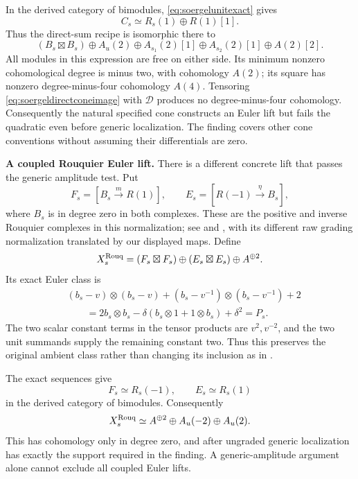 In the derived category of bimodules,
\eqref{eq:soergelunitexact} gives
\[
                     C_s\simeq R_s(1)\oplus R(1)[1].
\]
Thus the direct-sum recipe is isomorphic there to
\begin{equation}\label{eq:soergeldirectconeimage}
 (B_s\boxtimes B_s)\oplus A_u(2)
 \oplus A_{s_1}(2)[1]\oplus A_{s_2}(2)[1]
 \oplus A(2)[2].
\end{equation}
All modules in this expression are free on either side.
Its minimum nonzero cohomological degree is minus two,
with cohomology \(A(2)\); its square has nonzero
degree-minus-four cohomology \(A(4)\).
Tensoring \eqref{eq:soergeldirectconeimage} with
\(\mathscr D\) produces no degree-minus-four cohomology.
Consequently the natural specified cone constructs an
Euler lift but fails the quadratic even before generic
localization. The finding covers other cone conventions
without assuming their differentials are zero.

\par\smallskip\noindent\textbf{A coupled Rouquier Euler lift.}\quad
There is a different concrete lift that passes the generic
amplitude test. Put
\[
 F_s=[B_s\xrightarrow{m}R(1)],\qquad
 E_s=[R(-1)\xrightarrow{\eta}B_s],
\]
where \(B_s\) is in degree zero in both complexes. These
are the positive and inverse Rouquier complexes in this
normalization; see \cite[\S6.4, p.~1121]{EW} and
\cite[\S3.2.4 and Lemma~3.3, p.~9; \S3.3.1,
p.~10]{RouquierBraid}, with its different raw grading
normalization translated by our displayed maps.
Define
\begin{equation}\label{eq:soergelcoupledRouquier}
 X_s^{\rm Rouq}=(F_s\boxtimes F_s)
       \oplus(E_s\boxtimes E_s)\oplus A^{\oplus2}.
\end{equation}
Its exact Euler class is
\begin{align*}
 &(b_s-v)\otimes(b_s-v)
 +(b_s-v^{-1})\otimes(b_s-v^{-1})+2\\
 &\qquad=2b_s\otimes b_s
    -\delta(b_s\otimes1+1\otimes b_s)+\delta^2=P_s.
\end{align*}
The two scalar constant terms in the tensor products are
\(v^2,v^{-2}\), and the two unit summands supply the
remaining constant two. Thus this preserves the original
ambient class rather than changing its inclusion as in
.

The exact sequences give
\[
          F_s\simeq R_s(-1),\qquad E_s\simeq R_s(1)
\]
in the derived category of bimodules. Consequently
\begin{equation}\label{eq:soergelRouquierderivedimage}
 X_s^{\rm Rouq}\simeq A^{\oplus2}
                       \oplus A_u(-2)\oplus A_u(2).
\end{equation}
This has cohomology only in degree zero, and after
ungraded generic localization has exactly the support
required in the finding. A generic-amplitude argument
alone cannot exclude all coupled Euler lifts.

